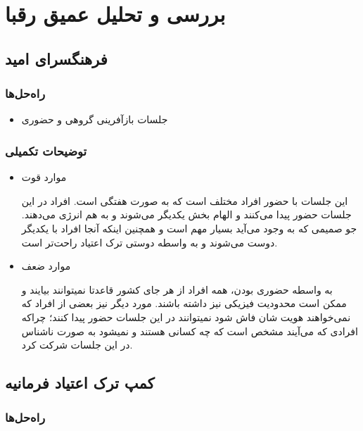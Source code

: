\documentclass[dvipsnames, svgnames, x11names, 11pt]{article}
\begin{document}
\section{بررسی و تحلیل عمیق رقبا}

\subsection{فرهنگسرای امید}
\subsubsection{راه‌حل‌ها}
\begin{itemize}
\item 
جلسات بازآفرینی گروهی و حضوری
\end{itemize}

\subsubsection{توضیحات تکمیلی}
\begin{itemize}
\item 
موارد قوت

این جلسات با حضور افراد مختلف است که به صورت هفتگی است. افراد در این جلسات حضور پیدا می‌کنند و الهام بخش یکدیگر می‌شوند و به هم انرژی می‌د‌هند. جو صمیمی که به وجود می‌آید بسیار مهم است و همچنین اینکه آنجا افراد با یکدیگر دوست می‌شوند و به واسطه دوستی ترک اعتیاد راحت‌تر است.

\item
موارد ضعف

به واسطه حضوری بودن، همه افراد از هر جای کشور قاعدتا نمیتوانند بیایند و ممکن است محدودیت فیزیکی نیز داشته باشند. مورد دیگر نیز بعضی از افراد که نمی‌خواهند هویت شان فاش شود نمیتوانند در این جلسات حضور پیدا کنند؛ چراکه افرادی که می‌آیند مشخص است که چه کسانی‌ هستند و نمیشود به صورت ناشناس در این جلسات شرکت کرد.
\end{itemize}


\subsection{کمپ ترک اعتیاد فرمانیه}
\subsubsection{راه‌حل‌ها}
\end{document}
